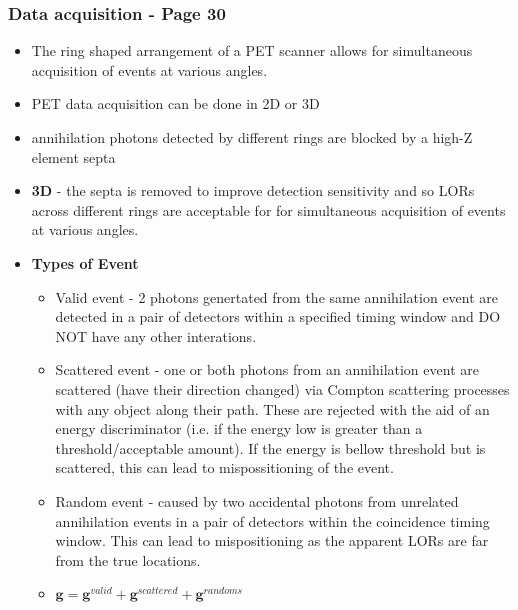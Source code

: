 \documentclass{article}
\begin{document}
\subsubsection{Data acquisition - Page 30}
\begin{itemize}
\item The ring shaped arrangement of a PET scanner allows for simultaneous acquisition of events at various angles.
\item PET data acquisition can be done in 2D or 3D
\item annihilation photons detected by different rings are blocked by a high-Z element septa
\item \textbf{3D} - the septa is removed to improve detection sensitivity and so LORs across different rings are acceptable for for simultaneous acquisition of events at various angles.
\item \textbf{Types of Event}
\begin{itemize}
\item Valid event - 2 photons genertated from the same annihilation event are detected in a pair of detectors within a specified timing window and DO NOT have any other interations.
\item Scattered event - one or both photons from an annihilation event are scattered (have their direction changed) via Compton scattering processes with any object along their path. These are rejected with the aid of an energy discriminator (i.e. if the energy low is greater than a threshold/acceptable amount). If the energy is bellow threshold but is scattered, this can lead to mispossitioning of the event.
\item Random event - caused by two accidental photons from unrelated annihilation events in a pair of detectors within the coincidence timing window. This can lead to mispositioning as the apparent LORs are far from the true locations.
\item $\textbf{g} = \textbf{g}^{valid} + \textbf{g}^{scattered} + \textbf{g}^{randoms}$
\end{itemize}
\end{itemize}
\end{document}

